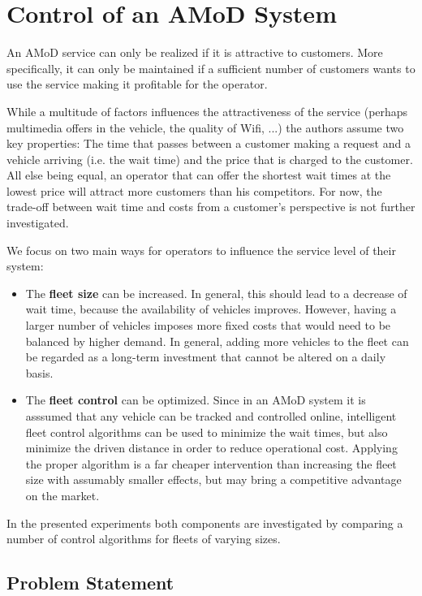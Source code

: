 \section{Control of an AMoD System}
\label{sec:background}

An AMoD service can only be realized if it is attractive to customers. More
specifically, it can only be maintained if a sufficient number of customers
wants to use the service making it profitable for the operator.

While a multitude of factors influences the attractiveness of the service (perhaps
multimedia offers in the vehicle, the quality of Wifi, ...) the authors assume
two key properties: The time that passes between a customer making a request
and a vehicle arriving (i.e. the wait time) and the price that is charged to
the customer. All else being equal, an operator that can offer the shortest wait
times at the lowest price will attract more customers than his competitors. For
now, the trade-off between wait time and costs from a customer's perspective is not further investigated. 

We focus on two main ways for operators to influence the service level of their system:

\begin{itemize}
\item The \textbf{fleet size} can be increased. In general, this should lead to
a decrease of wait time, because the availability of vehicles improves. However,
having a larger number of vehicles imposes more fixed costs that would need to be
balanced by higher demand. In general, adding more vehicles to the fleet can be
regarded as a long-term investment that cannot be altered on a daily basis.
\item The \textbf{fleet control} can be optimized. Since in an AMoD system it is
asssumed that any vehicle can be tracked and controlled online, intelligent fleet
control algorithms can be used to minimize the wait times, but also minimize the
driven distance in order to reduce operational cost. Applying the proper algorithm is a far cheaper intervention than increasing the fleet size with assumably smaller
effects, but may bring a competitive advantage on the market.
\end{itemize}

In the presented experiments both components are investigated by comparing a number
of control algorithms for fleets of varying sizes.

\subsection{Problem Statement}

